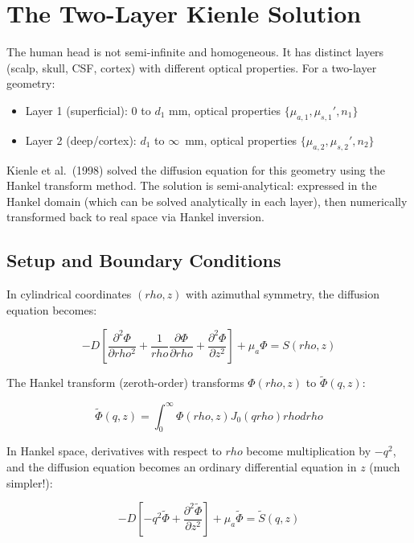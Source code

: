 \documentclass[12pt]{article}
\def\rho{rho}%
\def\,{ }%
\begin{document}
\section{The Two-Layer Kienle Solution}

The human head is not semi-infinite and homogeneous. It has distinct layers (scalp, skull, CSF, cortex) with different optical properties. For a two-layer geometry:

\begin{itemize}
\item Layer 1 (superficial): 0 to $d_1$ mm, optical properties $\{\mu_{a,1}, \mu_{s,1}', n_1\}$
\item Layer 2 (deep/cortex): $d_1$ to $\infty$~mm, optical properties $\{\mu_{a,2}, \mu_{s,2}', n_2\}$
\end{itemize}

Kienle et al.~(1998) solved the diffusion equation for this geometry using the Hankel transform method. The solution is semi-analytical: expressed in the Hankel domain (which can be solved analytically in each layer), then numerically transformed back to real space via Hankel inversion.

\subsection{Setup and Boundary Conditions}

In cylindrical coordinates $(\rho, z)$ with azimuthal symmetry, the diffusion equation becomes:

\begin{equation}
-D \left[ \frac{\partial^2 \Phi}{\partial \rho^2} + \frac{1}{\rho} \frac{\partial \Phi}{\partial \rho} + \frac{\partial^2 \Phi}{\partial z^2} \right] + \mu_a \Phi = S(\rho, z)
\end{equation}

The Hankel transform (zeroth-order) transforms $\Phi(\rho, z)$ to $\tilde{\Phi}(q, z)$:

\begin{equation}
\tilde{\Phi}(q, z) = \int_0^{\infty} \Phi(\rho, z) \, J_0(q\rho) \, \rho \, d\rho
\end{equation}

In Hankel space, derivatives with respect to $\rho$ become multiplication by $-q^2$, and the diffusion equation becomes an ordinary differential equation in $z$ (much simpler!):

\begin{equation}
-D \left[ -q^2 \tilde{\Phi} + \frac{\partial^2 \tilde{\Phi}}{\partial z^2} \right] + \mu_a \tilde{\Phi} = \tilde{S}(q, z)
\end{equation}
\end{document}
